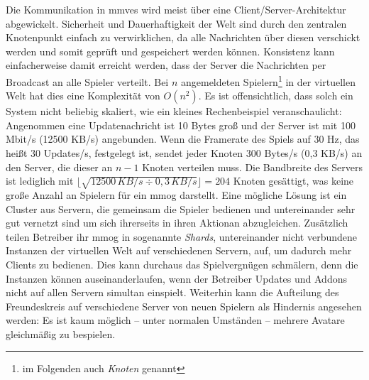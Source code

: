 Die Kommunikation in \acp{mmve} wird meist über eine Client/Server-Architektur abgewickelt. Sicherheit und Dauerhaftigkeit der Welt sind durch den zentralen Knotenpunkt einfach zu verwirklichen, da alle Nachrichten über diesen verschickt werden und somit geprüft und gespeichert werden können. Konsistenz kann einfacherweise damit erreicht werden, dass der Server die Nachrichten per Broadcast an alle Spieler verteilt. Bei $n$ angemeldeten Spielern\footnote{im Folgenden auch \emph{Knoten} genannt} in der virtuellen Welt hat dies eine Komplexität von $O(n^2)$.  Es ist offensichtlich, dass solch ein System nicht beliebig skaliert, wie ein kleines Rechenbeispiel veranschaulicht: Angenommen eine Updatenachricht ist 10 Bytes groß und der Server ist mit 100 Mbit/s (12500 KB/s) angebunden. Wenn die Framerate des Spiels auf 30 Hz, das heißt 30 Updates/s, festgelegt ist, sendet jeder Knoten 300 Bytes/s (0,3 KB/s) an den Server, die dieser an $n-1$ Knoten verteilen muss. Die Bandbreite des Servers ist lediglich mit $\lfloor\sqrt{12500\,KB/s \div 0,3\,KB/s}\rfloor = 204$ Knoten gesättigt, was keine große Anzahl an Spielern für ein \ac{mmog} darstellt. Eine mögliche Lösung ist ein Cluster aus Servern, die gemeinsam die Spieler bedienen und untereinander sehr gut vernetzt sind um sich ihrerseits in ihren Aktionan abzugleichen. Zusätzlich teilen Betreiber ihr \ac{mmog} in sogenannte \emph{Shards}, untereinander nicht verbundene Instanzen der virtuellen Welt auf verschiedenen Servern, auf, um dadurch mehr Clients zu bedienen. Dies kann durchaus das Spielvergnügen schmälern, denn die Instanzen können auseinanderlaufen, wenn der Betreiber Updates und Addons nicht auf allen Servern simultan einspielt. Weiterhin kann die Aufteilung des Freundeskreis auf verschiedene Server von neuen Spielern als Hindernis angesehen werden: Es ist kaum möglich -- unter normalen Umständen -- mehrere Avatare gleichmäßig zu bespielen.


